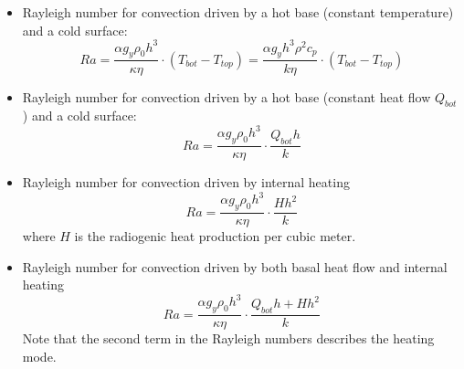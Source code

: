 \newpage

\begin{itemize}
\item Rayleigh number for convection driven by a hot base (constant temperature) and a cold surface:	
\[
Ra 
= \frac{\alpha g_y \rho_0 h^3 }{\kappa \eta} \cdot (T_{bot}-T_{top})
=\frac{\alpha g_y h^3 \rho^2 c_p}{k \eta}\cdot (T_{bot}-T_{top})
\]
\item Rayleigh number	for convection driven by a hot base (constant heat flow $Q_{bot}$) and a cold surface:	
\[
Ra = \frac{\alpha g_y \rho_0 h^3 }{\kappa \eta} \cdot \frac{Q_{bot} h }{k}
\]
\item Rayleigh  number for  convection  driven  by  internal  heating
\[
Ra = \frac{\alpha g_y \rho_0 h^3 }{\kappa \eta} \cdot \frac{H h^2 }{k}
\]
where $H$ is the radiogenic heat production per cubic meter.
\item Rayleigh number for convection driven by both basal heat flow and internal heating
\[
Ra = \frac{\alpha g_y \rho_0 h^3 }{\kappa \eta} \cdot \frac{Q_{bot} h + H h^2 }{k}
\]
Note that the second term in the Rayleigh numbers describes the heating mode.
\end{itemize}


